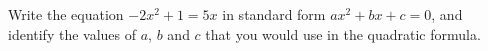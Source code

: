 Write the equation $-2x^2+1=5x$ in standard form $ax^2+bx+c=0$, and identify the values of $a$, $b$ and $c$ that you would use in the quadratic formula.
